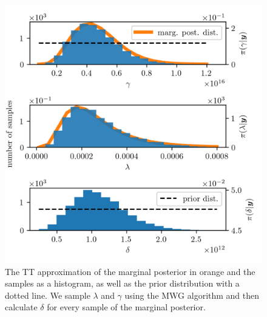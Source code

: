 \begin{figure}[ht!]
	\centering
	\includegraphics{secMargO3Res.png}
	\caption[Marginal posterior histograms and TT approximation as well as hyper-prior distribution.]{The TT approximation of the marginal posterior in orange and the samples as a histogram, as well as the prior distribution with a dotted line. We sample $\lambda$ and $\gamma$ using the MWG algorithm and then calculate $\delta$ for every sample of the marginal posterior.}
	\label{fig:MargPostHistTT}
\end{figure}


